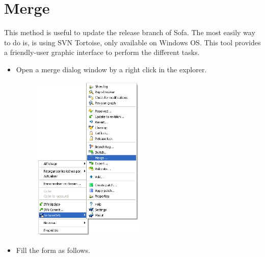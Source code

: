 
\newpage
\section{Merge}

This method is useful to update the release branch of Sofa. The most easily way to do is, is using SVN Tortoise, only available on Windows OS. This tool provides a friendly-user graphic interface to perform the different tasks. 
\begin{itemize}
        \item Open a merge dialog window by a right click in the explorer.
        \begin{figure}[htpb]
	\centering
		\includegraphics[width=0.50\textwidth]{mergedialog.png}
                \end{figure}
        \item Fill the form as follows.
 

\end{itemize}
